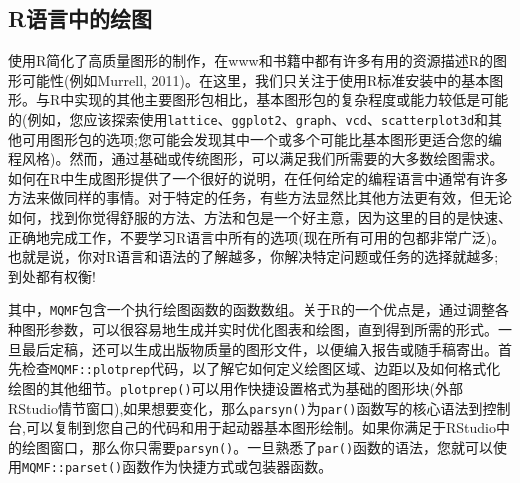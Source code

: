 \documentclass[
  lang=cn,
  11pt,
  scheme=chinese,
  chinesefont=nofont,
  citestyle=gb7714-2015,
  bibstyle=gb7714-2015]{elegantbook}
\begin{document}
\subsection{R语言中的绘图}\label{rux8bedux8a00ux4e2dux7684ux7ed8ux56fe}

使用R简化了高质量图形的制作，在www和书籍中都有许多有用的资源描述R的图形可能性(例如Murrell, 2011)。在这里，我们只关注于使用R标准安装中的基本图形。与R中实现的其他主要图形包相比，基本图形包的复杂程度或能力较低是可能的(例如，您应该探索使用\texttt{lattice}、\texttt{ggplot2}、\texttt{graph}、\texttt{vcd}、\texttt{scatterplot3d}和其他可用图形包的选项;您可能会发现其中一个或多个可能比基本图形更适合您的编程风格)。然而，通过基础或传统图形，可以满足我们所需要的大多数绘图需求。如何在R中生成图形提供了一个很好的说明，在任何给定的编程语言中通常有许多方法来做同样的事情。对于特定的任务，有些方法显然比其他方法更有效，但无论如何，找到你觉得舒服的方法、方法和包是一个好主意，因为这里的目的是快速、正确地完成工作，不要学习R语言中所有的选项(现在所有可用的包都非常广泛)。也就是说，你对R语言和语法的了解越多，你解决特定问题或任务的选择就越多;到处都有权衡!

其中，\texttt{MQMF}包含一个执行绘图函数的函数数组。关于R的一个优点是，通过调整各种图形参数，可以很容易地生成并实时优化图表和绘图，直到得到所需的形式。一旦最后定稿，还可以生成出版物质量的图形文件，以便编入报告或随手稿寄出。首先检查\texttt{MQMF::plotprep}代码，以了解它如何定义绘图区域、边距以及如何格式化绘图的其他细节。\texttt{plotprep()}可以用作快捷设置格式为基础的图形块(外部RStudio情节窗口),如果想要变化，那么\texttt{parsyn()}为\texttt{par()}函数写的核心语法到控制台,可以复制到您自己的代码和用于起动器基本图形绘制。如果你满足于RStudio中的绘图窗口，那么你只需要\texttt{parsyn()}。一旦熟悉了\texttt{par()}函数的语法，您就可以使用\texttt{MQMF::parset()}函数作为快捷方式或包装器函数。
\end{document}
